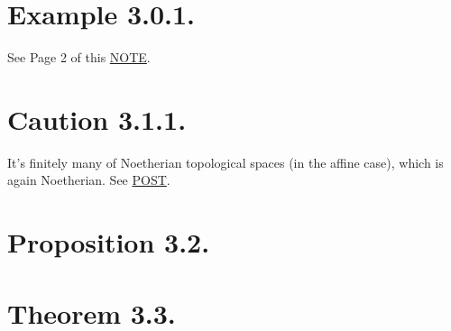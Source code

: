 \section{Example 3.0.1.}\label{Hart Chap 2 Example 3.0.1.}

See Page 2 of this \href{https://ocw.mit.edu/courses/18-726-algebraic-geometry-spring-2009/3723a99e97b581828fd782b9ffd83921_MIT18_726s09_lec11_more_schemes.pdf}{NOTE}.

\section{Caution 3.1.1.}

It's finitely many of Noetherian topological spaces (in the affine case), which is again Noetherian. See \href{https://math.stackexchange.com/questions/3388747/on-the-definition-of-noetherian-scheme}{POST}.

\section{Proposition 3.2.}



\section{Theorem 3.3.}

